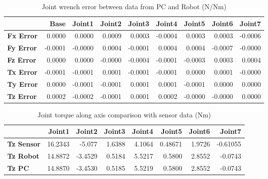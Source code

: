 \begin{table}[h!]
	\centering
	\caption{Joint wrench error between data from PC and Robot (N/Nm)}
	\label{wrech_Error_Pose2}
	\begin{tabular}{|l|r|r|r|r|r|r|r|r|}
		\hline
		\textbf{}  & \textbf{Base} & \textbf{Joint1}  & \textbf{Joint2}  & \textbf{Joint3}  & \textbf{Joint4}  & \textbf{Joint5}  & \textbf{Joint6}  & \textbf{Joint7} \\ \hline
		\textbf{Fx Error}  & 0.0000        & 0.0000        & 0.0009        & 0.0003        & -0.0004        & 0.0003        & 0.0003        & -0.0006 \\ \hline
		\textbf{Fy Error}  & -0.0001        & -0.0000        & 0.0004        & -0.0001        & 0.0004        & 0.0004        & -0.0007        & -0.0000 \\ \hline
		\textbf{Fz Error}  & 0.0000        & 0.0000        & -0.0000        & -0.0004        & -0.0001        & -0.0003        & 0.0003        & 0.0004 \\ \hline
		\textbf{Tx Error}  & -0.0001        & -0.0001        & 0.0001        & -0.0001        & -0.0001        & 0.0000        & 0.0001        & -0.0000 \\ \hline
		\textbf{Ty Error}  & 0.0000        & -0.0001        & -0.0001        & 0.0001        & 0.0001        & -0.0001        & 0.0000        & 0.0000 \\ \hline
		\textbf{Tz Error}  & 0.0002        & -0.0002        & -0.0001        & 0.0001        & 0.0002        & -0.0000        & -0.0000        & 0.0000 \\ \hline
	\end{tabular}
\end{table}

\begin{table}[h!]
	\centering
	\caption{Joint torque along axis comparison with sensor data (Nm)}
	\label{wrech_Sensor_Pose2}
	\begin{tabular}{|l|r|r|r|r|r|r|r|}
		\hline
		\textbf{} & \textbf{Joint1} & \textbf{Joint2} & \textbf{Joint3} & \textbf{Joint4} & \textbf{Joint5} & \textbf{Joint6} & \textbf{Joint7} \\ \hline
		\textbf{Tz Sensor}  & 16.2343           & -5.077           & 1.6388            & 4.1064           & 0.48671           & 1.9726           & -0.61055           \\ \hline
		\textbf{Tz Robot}  	& 14.8872           & -3.4529           & 0.5184            & 5.5217           & 0.5800           & 2.8552           & -0.0743           \\ \hline
		\textbf{Tz PC}  	& 14.8870           & -3.4530           & 0.5185            & 5.5219           & 0.5800           & 2.8552           & -0.0743           \\ \hline
	\end{tabular}
\end{table}

